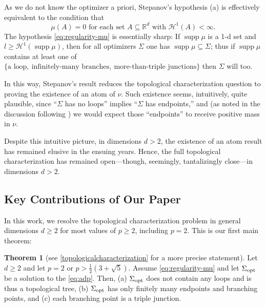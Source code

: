 \documentclass[preprint, reqno]{amsart}
\DeclareMathOperator*{\supp}{supp}
\renewcommand{\subset}{\subseteq}
\newcommand{\lbonpval}{\frac{1}{2}(3+\sqrt{5})}
\theoremstyle{definition}
\newtheorem{theorem}[definition]{Theorem}
\numberwithin{equation}{section}
\begin{document}
As we do not know the optimizer a priori, Stepanov's hypothesis (a) is
effectively equivalent to the condition that
\begin{equation}\label{eq:regularity-mu}
  \text{$\mu (A) =0$ for each set $A\subset \mathbb{R}^d$ with
    $\mathcal{H}^1(A) < \infty.$}
\end{equation}
The hypothesis \eqref{eq:regularity-mu} is essentially sharp: If
$\supp \mu$ is a 1-d set and $l \geq \mathcal H^1(\supp \mu)$, then
for all optimizers $\Sigma$ one has $\supp \mu \subseteq \Sigma$; thus
if $\supp \mu$ contains at least one of $\{\text{a loop},\
\text{infinitely-many branches},\ \text{more-than-triple junctions}\}$
then $\Sigma$ will too.


In this way, Stepanov's result \cite[Theorem 5.5]{Stepanov06} reduces
the topological characterization question to proving the existence of
an atom of $\nu$. Such existence seems, intuitively, quite plausible,
since ``$\Sigma$ has no loops'' \cite[Theorem 5.6]{Stepanov04} implies
``$\Sigma$ has endpoints,'' and (as noted in the discussion following
\cite[Lemma 7]{Lemenant12}) we would expect those ``endpoints'' to
receive positive mass in $\nu$.

Despite this intuitive picture, in dimensions $d > 2$, the existence
of an atom result has remained elusive in the ensuing years. Hence,
the full topological characterization has remained open---though,
seemingly, tantalizingly close---in dimensions $d > 2$.

\subsection{Key Contributions of Our Paper}

In this work, we resolve the topological characterization problem in
general dimensions $d \geq 2$ for most values of $p \geq 2$, including
$p=2$. This is our first main theorem:
\begin{theorem}[see \cref{topologicalcharacterization} for a more
  precise statement]\label{main:topologicalcharacterization} Let $d\ge
  2$ and let $p = 2$ or $p > \lbonpval$. Assume
  \eqref{eq:regularity-mu} and let $\Sigma_{\rm opt}$ be a solution to
  the \eqref{eq:adp}. Then, (a) $\Sigma_{\rm opt}$ does not contain
  any loops and is thus a topological tree, (b) $\Sigma_{\rm opt}$ has
  only finitely many endpoints and branching points, and (c) each
  branching point is a triple junction.
\end{theorem}
\end{document}
